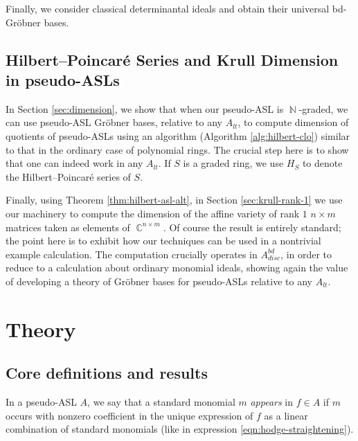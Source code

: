\documentclass[11pt,reqno]{amsart}
\DeclareMathOperator{\C}{\mathbb{C}}
\DeclareMathOperator{\N}{\mathbb{N}}
\newcommand{\gb}{Gr\"{o}bner }
\theoremstyle{definition}
\numberwithin{equation}{section}
\begin{document}

Finally, we consider classical determinantal ideals and obtain their universal bd-\gb bases.



\subsection{Hilbert--Poincar\'e Series and Krull Dimension in pseudo-ASLs}

In Section \ref{sec:dimension}, we show that when our pseudo-ASL is $\N$-graded, we can use pseudo-ASL \gb bases, relative to any $A_{lt}$, to compute dimension of quotients of pseudo-ASLs using an algorithm (Algorithm \ref{alg:hilbert-clo}) similar to that in the ordinary case of polynomial rings. The crucial step here is to show that one can indeed work in any $A_{lt}$. If $S$ is a graded ring, we use $H_S$ to denote the Hilbert--Poincaré series of $S$.


Finally, using Theorem \ref{thm:hilbert-asl-alt}, in Section \ref{sec:krull-rank-1} we use our machinery to compute the dimension of the affine variety of rank $1$ $n \times m$ matrices taken as elements of $\C^{n \times m}$. Of course the result is entirely standard; the point here is to exhibit how our techniques can be used in a nontrivial example calculation. The computation crucially operates in $A^{bd}_{disc}$, in order to reduce to a calculation about ordinary monomial ideals, showing again the value of developing a theory of \gb bases for pseudo-ASLs relative to any $A_{lt}$.


\newcommand{\qn}{0}

\section{Theory}
\label{sec:theory}

\subsection{Core definitions and results}

In a pseudo-ASL $A$, we say that a standard monomial $m$ \emph{appears} in $f \in A$ if $m$ occurs with nonzero coefficient in the unique expression of $f$ as a linear combination of standard monomials (like in expression \eqref{eqn:hodge-straightening}). 
\end{document}
